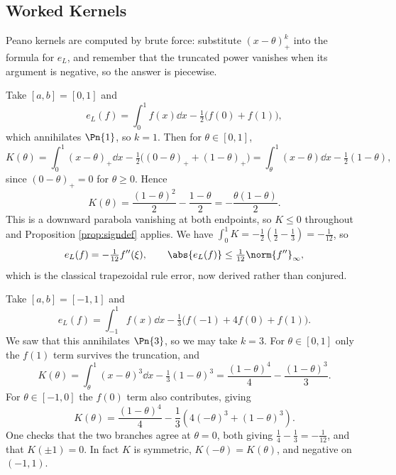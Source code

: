 \subsection{Worked Kernels}

Peano kernels are computed by brute force: substitute $(x-\theta)_+^k$ into the formula for $e_L$, and remember that the truncated power vanishes when its argument is negative, so the answer is piecewise.

\begin{example}\label{eg:trapkernel}
  Take $[a,b] = [0,1]$ and
  $$
  e_L(f) = \int_0^1 f(x)\dd x - \tfrac12\big(f(0) + f(1)\big),
  $$
  which annihilates $\Pn{1}$, so $k = 1$. Then for $\theta \in [0,1]$,
  $$
  K(\theta) = \int_0^1 (x-\theta)_+\dd x - \tfrac12\big((0-\theta)_+ + (1-\theta)_+\big) = \int_\theta^1 (x - \theta)\dd x - \tfrac12(1-\theta),
  $$
  since $(0-\theta)_+ = 0$ for $\theta \geq 0$. Hence
  $$
  K(\theta) = \frac{(1-\theta)^2}{2} - \frac{1-\theta}{2} = -\frac{\theta(1-\theta)}{2}.
  $$
  This is a downward parabola vanishing at both endpoints, so $K \leq 0$ throughout and Proposition \ref{prop:signdef} applies. We have $\int_0^1 K = -\tfrac12(\tfrac12 - \tfrac13) = -\tfrac1{12}$, so
  $$
  e_L(f) = -\tfrac{1}{12}f''(\xi), \qquad \abs{e_L(f)} \leq \tfrac{1}{12}\norm{f''}_\infty,
  $$
  which is the classical trapezoidal rule error, now derived rather than conjured.
\end{example}

\begin{example}\label{eg:simpsonkernel}
  Take $[a,b] = [-1,1]$ and
  $$
  e_L(f) = \int_{-1}^1 f(x)\dd x - \tfrac13\big(f(-1) + 4f(0) + f(1)\big).
  $$
  We saw that this annihilates $\Pn{3}$, so we may take $k = 3$. For $\theta \in [0,1]$ only the $f(1)$ term survives the truncation, and
  $$
  K(\theta) = \int_\theta^1 (x-\theta)^3\dd x - \tfrac13(1-\theta)^3 = \frac{(1-\theta)^4}{4} - \frac{(1-\theta)^3}{3}.
  $$
  For $\theta \in [-1,0]$ the $f(0)$ term also contributes, giving
  $$
  K(\theta) = \frac{(1-\theta)^4}{4} - \frac{1}{3}\left(4(-\theta)^3 + (1-\theta)^3\right).
  $$
  One checks that the two branches agree at $\theta = 0$, both giving $\tfrac14 - \tfrac13 = -\tfrac1{12}$, and that $K(\pm 1) = 0$. In fact $K$ is symmetric, $K(-\theta) = K(\theta)$, and negative on $(-1,1)$.
\end{example}

